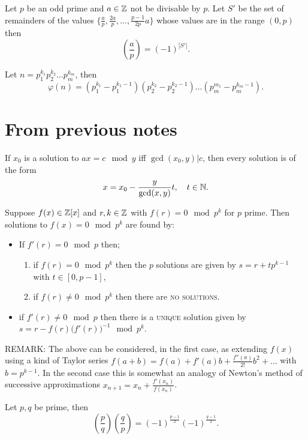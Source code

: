 \documentclass{article}
\begin{document}
\begin{theorem}
Let $p$ be an odd prime and $a\in\mathbb{Z}$ not be divisable by $p$. Let $S'$ be the set of remainders of the values $\{\frac{a}{p},\frac{2a}{p},\dots,\frac{p-1}{2p}a\}$ whose values are in the range $(0,p)$ then
    \[
    \left(\frac{a}{p}\right) = (-1)^{|S'|}.
    \]
\end{theorem}

\begin{theorem}
Let $n=p_1^{k_1}p_2^{k_2}\dots p_m^{k_m}$, then
    \[
    \varphi(n) = (p_1^{k_1} - p_1^{k_1-1})(p_2^{k_2} - p_2^{k_2-1})\dots(p_m^{m_1} - p_m^{k_m-1}).
    \]
\end{theorem}

\newpage
\section*{From previous notes}
\begin{theorem}
If $x_0$ is a solution to $ax=c\mod y$ iff $\gcd(x_0,y)|c$, then every solution is of the form
    \[
    x = x_0 -\frac{y}{\gcd(x,y)}t,\quad t\in\mathbb{N}.
    \]
\end{theorem}

\begin{theorem}[Hensel]
Suppose $f(x)\in\mathbb{Z}[x]$ and $r,k\in\mathbb{Z}$ with $f(r)=0\mod p^k$ for $p$ prime. Then solutions to $f(x)=0\mod p^k$ are found by:
    \begin{itemize}
        \item{If $f'(r)=0\mod p$ then;}
        \begin{enumerate}
            \item{if $f(r)=0\mod p^k$ then the $p$ solutions are given by $s = r + tp^{k-1}$ with $t\in[0,p-1]$,}
            \item{if $f(r)\neq0\mod p^k$ then there are \textsc{no solutions}.}
        \end{enumerate}
        \item{if $f'(r)\neq0\mod p$ then there is a \textsc{unique} solution given by $s = r-f(r)\big(f'(r)\big)^{-1} \mod p^k$.}
    \end{itemize}
\end{theorem}
\textsc{REMARK:} The above can be considered, in the first case, as extending $f(x)$ using a kind of Taylor series $f(a+b) = f(a)+f'(a)b+\frac{f''(a)}{2!}b^2+\dots$ with $b=p^{k-1}$. In the second case this is somewhat an analogy of Newton's method of successive approximations $x_{n+1}=x_n + \frac{f'(x_n)}{f(x_n)}$.

\begin{theorem}
Let $p,q$ be prime, then
    \[
    \left(\frac{p}{q}\right)\left(\frac{q}{p}\right) 
    = (-1)^{\frac{p-1}{2}}(-1)^{\frac{q-1}{2}}.
    \]
\end{theorem}
\end{document}

